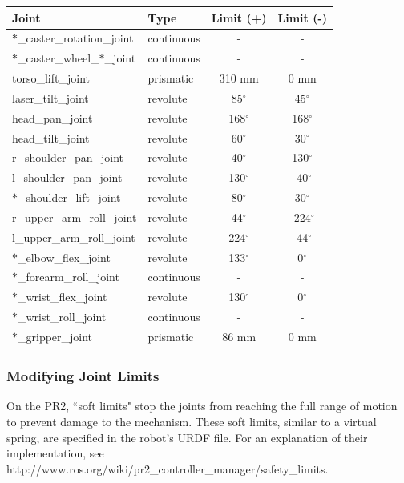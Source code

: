 \begin{tabular}{ll*{2}{c}}
Joint  & Type  & Limit (+) & Limit (-) \\
\hline \hline
$\ast$\_caster\_rotation\_joint        & continuous & -            & - \\
$\ast$\_caster\_wheel\_$\ast$\_joint   & continuous & -            & - \\
torso\_lift\_joint                     & prismatic  & 310 mm       & 0 mm \\
laser\_tilt\_joint                     & revolute   & 85$^\circ$   & 45$^\circ$ \\
head\_pan\_joint                       & revolute   & 168$^\circ$  & 168$^\circ$  \\
head\_tilt\_joint                      & revolute   & 60$^\circ$   & 30$^\circ$  \\
r\_shoulder\_pan\_joint                 & revolute   & 40$^\circ$   & 130$^\circ$  \\
l\_shoulder\_pan\_joint                 & revolute   & 130$^\circ$  & -40$^\circ$  \\
$\ast$\_shoulder\_lift\_joint          & revolute   & 80$^\circ$   & 30$^\circ$  \\
r\_upper\_arm\_roll\_joint              & revolute   & 44$^\circ$   & -224$^\circ$  \\
l\_upper\_arm\_roll\_joint              & revolute   & 224$^\circ$  & -44$^\circ$  \\
$\ast$\_elbow\_flex\_joint             & revolute   & 133$^\circ$  & 0$^\circ$  \\
$\ast$\_forearm\_roll\_joint           & continuous & -            & - \\
$\ast$\_wrist\_flex\_joint             & revolute   & 130$^\circ$  & 0$^\circ$  \\
$\ast$\_wrist\_roll\_joint             & continuous & -            & - \\
$\ast$\_gripper\_joint                 & prismatic  & 86 mm        & 0 mm \\
\end{tabular}

\subsubsection{Modifying Joint Limits}

On the PR2, ``soft limits" stop the joints from reaching the full range of
motion to prevent damage to the mechanism. These soft limits, similar to a
virtual spring, are specified in the robot's URDF file. For an explanation of
their implementation, see
http://www.ros.org/wiki/pr2\_controller\_manager/safety\_limits.

